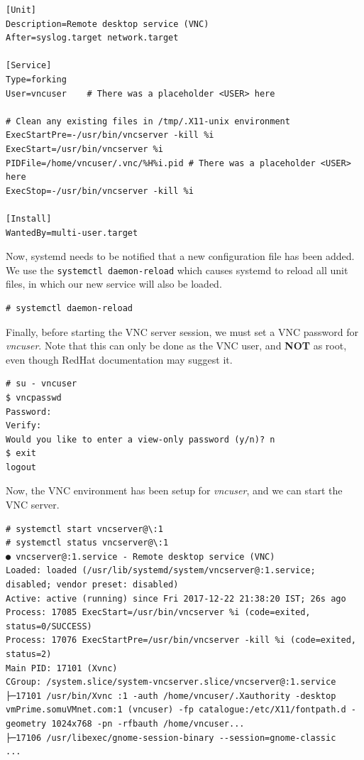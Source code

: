 \vspace{-15pt}
\begin{verbatim}
[Unit]
Description=Remote desktop service (VNC)
After=syslog.target network.target

[Service]
Type=forking
User=vncuser	# There was a placeholder <USER> here

# Clean any existing files in /tmp/.X11-unix environment
ExecStartPre=-/usr/bin/vncserver -kill %i
ExecStart=/usr/bin/vncserver %i
PIDFile=/home/vncuser/.vnc/%H%i.pid	# There was a placeholder <USER> here
ExecStop=-/usr/bin/vncserver -kill %i

[Install]
WantedBy=multi-user.target
\end{verbatim}
\vspace{-10pt}

\noindent
Now, systemd needs to be notified that a new configuration file has been added. We use the \verb|systemctl daemon-reload| which causes systemd to reload all unit files, in which our new service will also be loaded. 

\vspace{-15pt}
\begin{verbatim}
# systemctl daemon-reload
\end{verbatim}
\vspace{-10pt}

\noindent
Finally, before starting the VNC server session, we must set a VNC password for \textit{vncuser}. Note that this can only be done as the VNC user, and \textbf{NOT} as root, even though RedHat documentation may suggest it. 

\vspace{-15pt}
\begin{verbatim}
# su - vncuser
$ vncpasswd
Password:
Verify:
Would you like to enter a view-only password (y/n)? n
$ exit
logout
\end{verbatim}
\vspace{-10pt}

\noindent
Now, the VNC environment has been setup for \textit{vncuser}, and we can start the VNC server.

\vspace{-15pt}
\begin{verbatim}
# systemctl start vncserver@\:1
# systemctl status vncserver@\:1
● vncserver@:1.service - Remote desktop service (VNC)
Loaded: loaded (/usr/lib/systemd/system/vncserver@:1.service; disabled; vendor preset: disabled)
Active: active (running) since Fri 2017-12-22 21:38:20 IST; 26s ago
Process: 17085 ExecStart=/usr/bin/vncserver %i (code=exited, status=0/SUCCESS)
Process: 17076 ExecStartPre=/usr/bin/vncserver -kill %i (code=exited, status=2)
Main PID: 17101 (Xvnc)
CGroup: /system.slice/system-vncserver.slice/vncserver@:1.service
├─17101 /usr/bin/Xvnc :1 -auth /home/vncuser/.Xauthority -desktop vmPrime.somuVMnet.com:1 (vncuser) -fp catalogue:/etc/X11/fontpath.d -geometry 1024x768 -pn -rfbauth /home/vncuser...
├─17106 /usr/libexec/gnome-session-binary --session=gnome-classic
...
\end{verbatim}
\vspace{-10pt}

